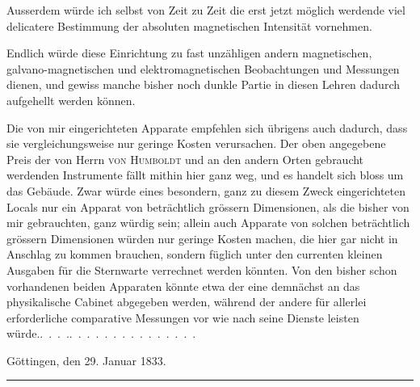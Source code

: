 Ausserdem würde ich selbst von Zeit zu Zeit die erst jetzt möglich
werdende viel delicatere Bestimmung der absoluten magnetischen Intensität
vornehmen.

Endlich würde diese Einrichtung zu fast unzähligen andern magnetischen,
galvano-magnetischen und elektromagnetischen Beobachtungen und Messungen
dienen, und gewiss manche bisher noch dunkle Partie in diesen Lehren dadurch
aufgehellt werden können.

Die von mir eingerichteten Apparate empfehlen sich übrigens auch dadurch,
dass sie vergleichungsweise nur geringe Kosten verursachen. Der oben
angegebene Preis der von Herrn \textsc{von Humboldt} und an den andern Orten
gebraucht werdenden Instrumente fällt mithin hier ganz weg, und es handelt
sich bloss um das Gebäude. Zwar würde eines besondern, ganz zu diesem
Zweck eingerichteten Locals nur ein Apparat von beträchtlich grössern Dimensionen,
als die bisher von mir gebrauchten, ganz würdig sein; allein auch
Apparate von solchen beträchtlich grössern Dimensionen würden nur geringe
Kosten machen, die hier gar nicht in Anschlag zu kommen brauchen, sondern
füglich unter den currenten kleinen Ausgaben für die Sternwarte verrechnet
werden könnten. Von den bisher schon vorhandenen beiden Apparaten
könnte etwa der eine demnächst an das physikalische Cabinet abgegeben
werden, während der andere für allerlei erforderliche comparative Messungen
vor wie nach seine Dienste leisten würde.\quad .\ .\ .\ .\hspace{1.1em}.\ .\ .\ .\ .\ .\ .\ .\ .\ .\ .\ .\ .\ .\ .

Göttingen, den 29. Januar 1833.
\begin{center}\rule{.18\textwidth}{.35pt}\end{center}
\clearpage\endgroup
